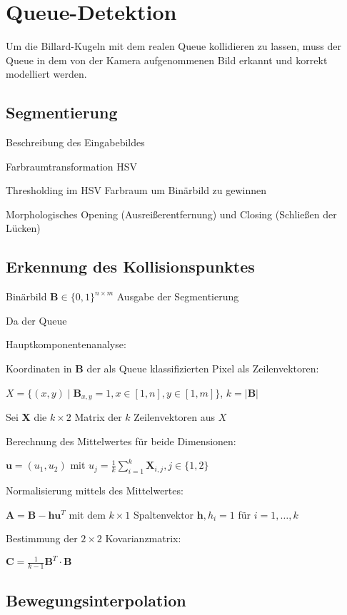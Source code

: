 \section{Queue-Detektion}


Um die Billard-Kugeln mit dem realen Queue kollidieren zu lassen, muss der Queue in dem von der Kamera aufgenommenen Bild erkannt und korrekt modelliert werden. 






\subsection{Segmentierung}
Beschreibung des Eingabebildes

Farbraumtransformation HSV

Thresholding im HSV Farbraum um Binärbild zu gewinnen 

Morphologisches Opening (Ausreißerentfernung) und Closing (Schließen der Lücken)


\subsection{Erkennung des Kollisionspunktes}
Binärbild $\textbf{B} \in \{0, 1\}^{n\times m}$ Ausgabe der Segmentierung

Da der Queue 

Hauptkomponentenanalyse:

Koordinaten in $\textbf{B}$ der als Queue klassifizierten Pixel als Zeilenvektoren:

$X = \{(x, y) \mid \textbf{B}_{x,y} = 1, x \in [1,n], y \in [1,m]\}$, $k = |\textbf{B}|$

Sei $\textbf{X}$ die $k\times 2$ Matrix der $k$ Zeilenvektoren aus $X$

Berechnung des Mittelwertes für beide Dimensionen:

$\textbf{u} = (u_1, u_2)$ mit $u_j = \frac{1}{k}\sum_{i=1}^{k}\textbf{X}_{i, j}, j \in \{1,2\}$

Normalisierung mittels des Mittelwertes:

$\textbf{A} = \textbf{B} - \textbf{h}\textbf{u}^{T}$ mit dem $k\times 1$ Spaltenvektor $\textbf{h}, h_i = 1$ für $i = 1,\dots,k$

Bestimmung der $2\times2$ Kovarianzmatrix:

$\textbf{C} = \frac{1}{k-1} {\textbf{B}}^{T} \cdot \textbf{B}$









\subsection{Bewegungsinterpolation}